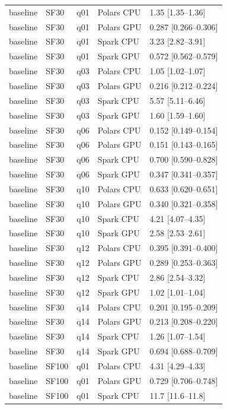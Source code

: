 \begin{longtable}{lllll}
baseline & SF30 & q01 & Polars CPU & 1.35 [1.35--1.36] \\
baseline & SF30 & q01 & Polars GPU & 0.287 [0.266--0.306] \\
baseline & SF30 & q01 & Spark CPU & 3.23 [2.82--3.91] \\
baseline & SF30 & q01 & Spark GPU & 0.572 [0.562--0.579] \\
baseline & SF30 & q03 & Polars CPU & 1.05 [1.02--1.07] \\
baseline & SF30 & q03 & Polars GPU & 0.216 [0.212--0.224] \\
baseline & SF30 & q03 & Spark CPU & 5.57 [5.11--6.46] \\
baseline & SF30 & q03 & Spark GPU & 1.60 [1.59--1.60] \\
baseline & SF30 & q06 & Polars CPU & 0.152 [0.149--0.154] \\
baseline & SF30 & q06 & Polars GPU & 0.151 [0.143--0.165] \\
baseline & SF30 & q06 & Spark CPU & 0.700 [0.590--0.828] \\
baseline & SF30 & q06 & Spark GPU & 0.347 [0.341--0.357] \\
baseline & SF30 & q10 & Polars CPU & 0.633 [0.620--0.651] \\
baseline & SF30 & q10 & Polars GPU & 0.340 [0.321--0.358] \\
baseline & SF30 & q10 & Spark CPU & 4.21 [4.07--4.35] \\
baseline & SF30 & q10 & Spark GPU & 2.58 [2.53--2.61] \\
baseline & SF30 & q12 & Polars CPU & 0.395 [0.391--0.400] \\
baseline & SF30 & q12 & Polars GPU & 0.289 [0.253--0.363] \\
baseline & SF30 & q12 & Spark CPU & 2.86 [2.54--3.32] \\
baseline & SF30 & q12 & Spark GPU & 1.02 [1.01--1.04] \\
baseline & SF30 & q14 & Polars CPU & 0.201 [0.195--0.209] \\
baseline & SF30 & q14 & Polars GPU & 0.213 [0.208--0.220] \\
baseline & SF30 & q14 & Spark CPU & 1.26 [1.07--1.54] \\
baseline & SF30 & q14 & Spark GPU & 0.694 [0.688--0.709] \\
baseline & SF100 & q01 & Polars CPU & 4.31 [4.29--4.33] \\
baseline & SF100 & q01 & Polars GPU & 0.729 [0.706--0.748] \\
baseline & SF100 & q01 & Spark CPU & 11.7 [11.6--11.8] \\

\end{longtable}
